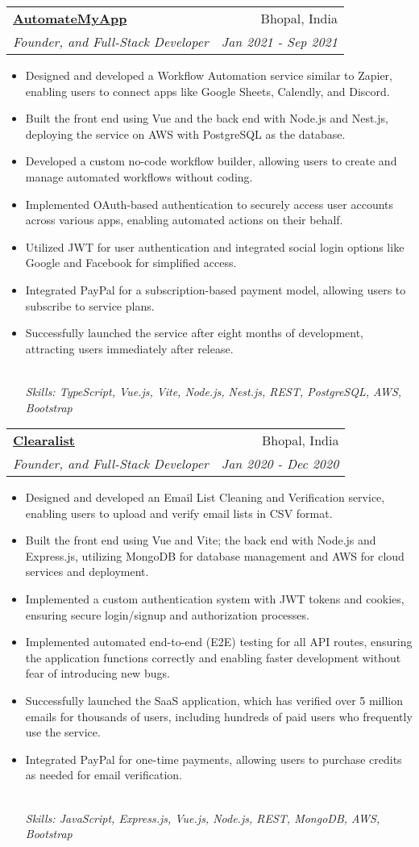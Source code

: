 \documentclass[letterpaper,12pt]{article}
\makeatletter
\newcommand{\resumeItem}[1]{
  \item\small{#1}\vspace{-2pt}
}
\newcommand{\resumeSubheading}[4]{
  \vspace{-2pt}\item
    \begin{tabular*}{0.97\textwidth}[t]{l@{\extracolsep{\fill}}r}
      \textbf{#1} & \small{#2} \\
      \emph{\small{#3}} & \emph{\small{#4}} \\
    \end{tabular*}\vspace{-5pt}
}
\newcommand{\resumeItemFooter}[1]{
    \\ \vspace{7pt}\hspace{-0.35in}\footnotesize\emph{#1}
}
\newcommand{\resumeItemListStart}{\begin{itemize}}
\newcommand{\resumeItemListEnd}{\end{itemize}\vspace{-5pt}}
\def\myHometown{Bhopal, India}
\def\automateMyAppLink{https://automatemyapp.com}
\def\clearalistLink{https://clearalist.com}
\makeatother
\begin{document}
\resumeSubheading
{\href{\automateMyAppLink}{\color{blue}AutomateMyApp}}{\myHometown}
{Founder, and Full-Stack Developer}{Jan 2021 - Sep 2021}
\resumeItemListStart
\resumeItem{Designed and developed a Workflow Automation service similar to Zapier, enabling users to connect apps like Google Sheets, Calendly, and Discord.}
\resumeItem{Built the front end using Vue and the back end with Node.js and Nest.js, deploying the service on AWS with PostgreSQL as the database.}
\resumeItem{Developed a custom no-code workflow builder, allowing users to create and manage automated workflows without coding.}
\resumeItem{Implemented OAuth-based authentication to securely access user accounts across various apps, enabling automated actions on their behalf.}
\resumeItem{Utilized JWT for user authentication and integrated social login options like Google and Facebook for simplified access.}
\resumeItem{Integrated PayPal for a subscription-based payment model, allowing users to subscribe to service plans.}
\resumeItem{Successfully launched the service after eight months of development, attracting users immediately after release.}
\resumeItemFooter{Skills: TypeScript, Vue.js, Vite, Node.js, Nest.js, REST, PostgreSQL, AWS, Bootstrap}
\resumeItemListEnd

\resumeSubheading
{\href{\clearalistLink}{\color{blue}Clearalist}}{\myHometown}
{Founder, and Full-Stack Developer}{Jan 2020 - Dec 2020}
\resumeItemListStart
\resumeItem{Designed and developed an Email List Cleaning and Verification service, enabling users to upload and verify email lists in CSV format.}
\resumeItem{Built the front end using Vue and Vite; the back end with Node.js and Express.js, utilizing MongoDB for database management and AWS for cloud services and deployment.}
\resumeItem{Implemented a custom authentication system with JWT tokens and cookies, ensuring secure login/signup and authorization processes.}
\resumeItem{Implemented automated end-to-end (E2E) testing for all API routes, ensuring the application functions correctly and enabling faster development without fear of introducing new bugs.}
\resumeItem{Successfully launched the SaaS application, which has verified over 5 million emails for thousands of users, including hundreds of paid users who frequently use the service.}
\resumeItem{Integrated PayPal for one-time payments, allowing users to purchase credits as needed for email verification.}
\resumeItemFooter{Skills: JavaScript, Express.js, Vue.js, Node.js, REST, MongoDB, AWS, Bootstrap}
\resumeItemListEnd
\end{document}
